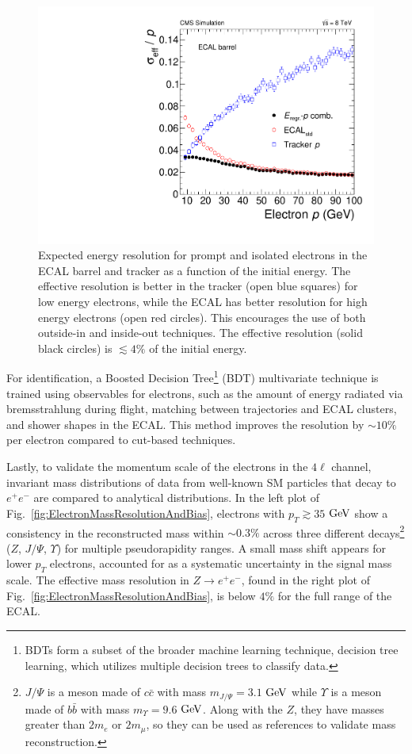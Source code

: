 \begin{figure}[htbp]
\begin{center}
\includegraphics[width=.6\linewidth]{HiggsDiscovery/figures/effRMSbarrel_withregression_new.pdf}
\caption[Expected Energy Resolution for Electrons]{Expected energy resolution for prompt and isolated electrons in the ECAL barrel and tracker as a function of the initial energy. The effective resolution is better in the tracker (open blue squares) for low energy electrons, while the ECAL has better resolution for high energy electrons (open red circles). This encourages the use of both outside-in and inside-out techniques. The effective resolution (solid black circles) is $\lesssim 4\%$ of the initial energy. }
\label{fig:ElectronEnergyResolution}
\end{center}
\end{figure}

For identification, a Boosted Decision Tree\footnote{BDTs form a subset of the broader machine learning technique, decision tree learning, which utilizes multiple decision trees to classify data.} (BDT) multivariate technique \cite{ElectronBDT:2012} is trained using observables for electrons, such as the amount of energy radiated via bremsstrahlung during flight, matching between trajectories and ECAL clusters, and shower shapes in the ECAL. This method improves the resolution by $\sim 10\%$ per electron compared to cut-based techniques.

Lastly, to validate the momentum scale of the electrons in the $4\ell$ channel, invariant mass distributions of data from well-known SM particles that decay to $e^+e^-$ are compared to analytical distributions. In the left plot of Fig.~\ref{fig:ElectronMassResolutionAndBias}, electrons with $p_T\gtrsim35$ $\rm{GeV}$ show a consistency in the reconstructed mass within $\sim0.3\%$ across three different decays\footnote{$J/\Psi$ is a meson made of $c\bar{c}$ with mass $m_{J/\Psi}=3.1$ $\rm{GeV}$ while $\Upsilon$ is a meson made of $b\bar{b}$ with mass $m_{\Upsilon}=9.6$ $\rm{GeV}$. Along with the $Z$, they have masses greater than $2m_e$ or $2m_\mu$, so they can be used as references to validate mass reconstruction.} ($Z$, $J/\Psi$, $\Upsilon$) for multiple pseudorapidity ranges. A small mass shift appears for lower $p_T$ electrons, accounted for as a systematic uncertainty in the signal mass scale. The effective mass resolution in $Z\rightarrow e^+e^-$, found in  the right plot of Fig.~\ref{fig:ElectronMassResolutionAndBias}, is below $4\%$ for the full range of the ECAL.

